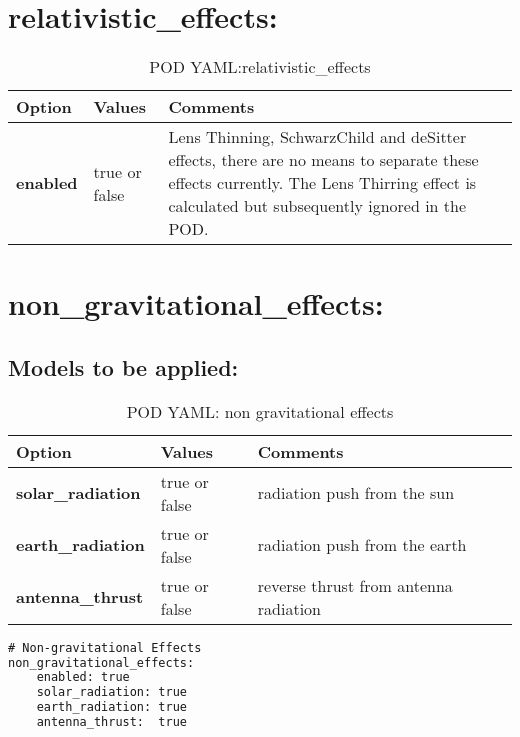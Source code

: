 \section{relativistic\_effects:}
\begin{table}[h!]
	\begin{tabular}{|p{4.5cm}|p{2cm}|p{3.5cm}|}
		\hline
		Option & Values & Comments \\
		\hline
		\textbf{enabled} & true or false & Lens Thinning, SchwarzChild and deSitter effects, there are no means to separate these effects currently. The Lens Thirring effect is calculated but subsequently ignored in the POD.\\
		\hline
	\end{tabular}
	\caption{POD YAML:relativistic\_effects}
	\label{table:pod_yaml_relativistic_effects}
\end{table}
%
\section{non\_gravitational\_effects:}
\subsection{Models to be applied:}
\begin{table}[h!]
	\begin{tabular}{|p{4.5cm}|p{2cm}|p{3.5cm}|}
		\hline
		Option & Values & Comments \\
		\hline
		\textbf{solar\_radiation} & true or false & radiation push from the sun \\
		\textbf{earth\_radiation} & true or false & radiation push from the earth \\
		\textbf{antenna\_thrust}  & true or false & reverse thrust from antenna radiation \\
		\hline
	\end{tabular}
	\caption{POD YAML: non gravitational effects}
	\label{table:pod_yaml_non_grav}
\end{table}
%
\begin{lstlisting}[language=xml,caption=yaml example for non gravitational effects]
# Non-gravitational Effects
non_gravitational_effects:
	enabled: true
	solar_radiation: true
	earth_radiation: true
	antenna_thrust:  true
\end{lstlisting}

